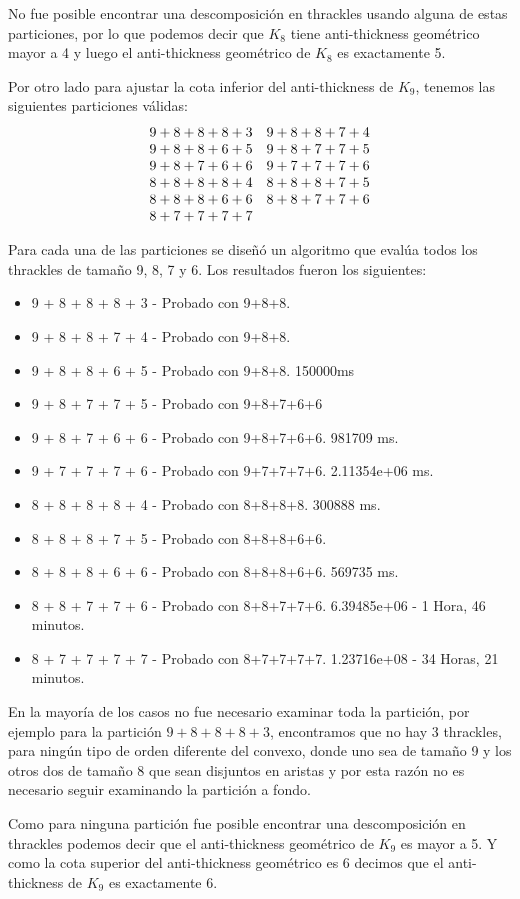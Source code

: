 No fue posible encontrar una descomposición en thrackles usando alguna de estas
particiones, por lo que podemos decir que $K_8$ tiene anti-thickness geométrico
mayor a 4 y luego el anti-thickness geométrico de $K_8$ es exactamente 5.

Por otro lado para ajustar la cota inferior del anti-thickness de $K_9$,
tenemos las siguientes particiones válidas:
\[
\begin{array}{l l}
9 + 8 + 8 + 8 + 3 & 9 + 8 + 8 + 7 + 4 \\
9 + 8 + 8 + 6 + 5 & 9 + 8 + 7 + 7 + 5 \\
9 + 8 + 7 + 6 + 6 & 9 + 7 + 7 + 7 + 6 \\
8 + 8 + 8 + 8 + 4 & 8 + 8 + 8 + 7 + 5 \\
8 + 8 + 8 + 6 + 6 & 8 + 8 + 7 + 7 + 6 \\
8 + 7 + 7 + 7 + 7
\end{array}
\]

Para cada una de las particiones se diseñó un algoritmo que evalúa todos los thrackles
de tamaño 9, 8, 7 y 6. Los resultados fueron los siguientes:

\begin{itemize}
  \item 9 + 8 + 8 + 8 + 3 - Probado con 9+8+8.
  \item 9 + 8 + 8 + 7 + 4 - Probado con 9+8+8.
  \item 9 + 8 + 8 + 6 + 5 - Probado con 9+8+8. 150000ms
  \item 9 + 8 + 7 + 7 + 5 - Probado con 9+8+7+6+6
  \item 9 + 8 + 7 + 6 + 6 - Probado con 9+8+7+6+6. 981709 ms.
  \item 9 + 7 + 7 + 7 + 6 - Probado con 9+7+7+7+6. 2.11354e+06 ms.
  \item 8 + 8 + 8 + 8 + 4 - Probado con 8+8+8+8. 300888 ms.
  \item 8 + 8 + 8 + 7 + 5 - Probado con 8+8+8+6+6.
  \item 8 + 8 + 8 + 6 + 6 - Probado con 8+8+8+6+6. 569735 ms.
  \item 8 + 8 + 7 + 7 + 6 - Probado con 8+8+7+7+6. 6.39485e+06 - 1 Hora, 46 minutos.
  \item 8 + 7 + 7 + 7 + 7 - Probado con 8+7+7+7+7. 1.23716e+08 - 34 Horas, 21 minutos.
\end{itemize}

En la mayoría de los casos no fue necesario examinar toda la partición, por ejemplo
para la partición $9+8+8+8+3$, encontramos que no hay 3 thrackles, para ningún
tipo de orden diferente del convexo, donde uno sea de tamaño 9
y los otros dos de tamaño 8 que sean disjuntos en aristas y por esta razón no es necesario
seguir examinando la partición a fondo.

Como para ninguna partición fue posible encontrar una descomposición en thrackles
podemos decir que el anti-thickness geométrico de $K_9$ es mayor a 5. Y como la cota
superior del anti-thickness geométrico es 6 decimos que el anti-thickness de $K_9$
es exactamente 6.
